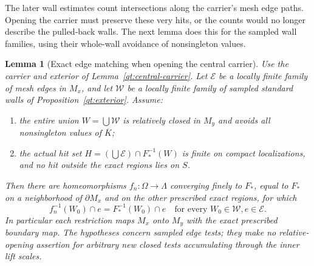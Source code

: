 \documentclass[11pt]{article}
\numberwithin{equation}{section}
\newtheorem{lemma}[theorem]{Lemma}
\theoremstyle{definition}
\theoremstyle{remark}
\begin{document}
The later wall estimates count intersections along the carrier's mesh
edge paths.  Opening the carrier must preserve these very hits, or the
counts would no longer describe the pulled-back walls.  The next lemma
does this for the sampled wall families, using their whole-wall
avoidance of nonsingleton values.

\begin{lemma}[Exact edge matching when opening the central carrier]
\label{qt:edge-matching}
Use the carrier and exterior of Lemma~\ref{qt:central-carrier}.
Let $\mathcal E$ be a locally finite family of mesh edges in $M_x$,
and let $\mathcal W$ be a locally finite family of sampled standard
walls of Proposition~\ref{qt:exterior}.  Assume:
\begin{enumerate}
\item the entire union $W=\bigcup\mathcal W$ is relatively closed
in $M_y$ and avoids all nonsingleton values of $\overline K$;
\item the actual hit set
$H=(\bigcup\mathcal E)\cap F_*^{-1}(W)$ is finite on compact
localizations, and no hit outside the exact regions lies on $S$.
\end{enumerate}
Then there are homeomorphisms $f_n:\Omega\to\Lambda$ converging
finely to $F_*$, equal to $F_*$ on a neighborhood of $\partial M_x$
and on the other prescribed exact regions, for which
\[
 f_n^{-1}(W_0)\cap e=F_*^{-1}(W_0)\cap e
 \quad\text{for every }W_0\in\mathcal W, e\in\mathcal E.
\]
In particular each restriction maps $M_x$ onto $M_y$ with the exact
prescribed boundary map.  The hypotheses concern sampled edge
tests; they make no relative-opening assertion for arbitrary new
closed tests accumulating through the inner lift scales.
\end{lemma}
\end{document}
